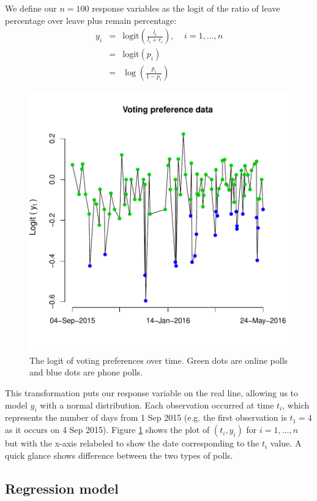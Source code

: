\documentclass{asaproc}
\begin{document}
We define our $n=100$ response variables as the logit of the ratio of leave percentage over leave plus remain percentage:
\begin{eqnarray*}
y_i &=& \mathrm{logit}\left(\frac{l_i}{l_i+r_i}\right),~~~~~ i=1,\ldots,n \\
&=& \mathrm{logit}(p_i) \\
&=& \log\left(\frac{p_i}{1-p_i}\right)
\end{eqnarray*}
\begin{figure}
\begin{center}
\includegraphics[scale=0.52]{figs/data.pdf}
\caption{The logit of voting preferences over time. Green dots are online polls and blue dots are phone polls.}
\label{data}
\end{center}
\end{figure}
This transformation puts our response variable on the real line, allowing us to model $y_i$ with a normal distribution. Each observation occurred at time $t_i$, which represents the number of days from 1 Sep 2015 (e.g. the first observation is $t_1=4$ as it occurs on 4 Sep 2015). Figure \ref{data} shows the plot of $(t_i, y_i)$ for $i=1,\ldots,n$ but with the x-axis relabeled to show the date corresponding to the $t_i$ value. A quick glance shows difference between the two types of polls.

\subsection{Regression model}
\end{document}

